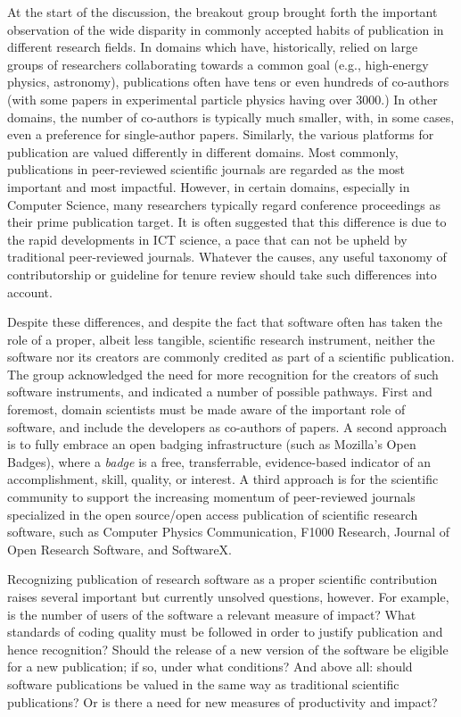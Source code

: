 \documentclass[11pt, oneside]{amsart}
\begin{document}
At the start of the discussion, the breakout group brought forth the
important observation of the wide disparity in commonly accepted habits of
publication in different research fields.
In domains which have, historically, relied on large groups of researchers
collaborating towards a common goal (e.g., high-energy physics,
astronomy), publications often have tens or even hundreds of co-authors (with
some papers in experimental particle physics having over 3000.)
In other domains, the number of co-authors is typically much smaller,
with, in some cases, even a preference for single-author papers.
Similarly, the various platforms for publication are valued differently in
different domains.
Most commonly, publications in peer-reviewed scientific journals are regarded
as the most important and most impactful.
However, in certain domains, especially in Computer Science, many researchers
typically regard conference proceedings as their prime publication target.
It is often suggested that this difference is due to the rapid developments
in ICT science, a pace that can not be upheld by traditional peer-reviewed
journals.
Whatever the causes, any useful taxonomy of contributorship or guideline for
tenure review should take such differences into account.

Despite these differences, and despite the fact that software often
has taken the role of a proper, albeit less tangible, scientific research
instrument, neither the software nor its creators are commonly credited as part
of a scientific publication.
The group acknowledged the need for more recognition for the creators of such
software instruments, and indicated a number of possible pathways.
First and foremost, domain scientists must be made aware of the important role
of software, and include the developers as co-authors of papers.
A second approach is to fully embrace an open badging infrastructure (such as
Mozilla's Open Badges), where a {\em badge\/} is a free, transferrable, 
evidence-based indicator of an accomplishment, skill, quality, or interest.
A third approach is for the scientific community to support the increasing
momentum of peer-reviewed journals specialized in the open source/open
access publication of scientific research software, such as Computer Physics
Communication, F1000 Research, Journal of Open Research Software, and SoftwareX.

Recognizing publication of research software as a proper scientific
contribution raises several important but currently unsolved questions,
however.
For example, is the number of users of the software a relevant measure of
impact?
What standards of coding quality must be followed in order to justify
publication and hence recognition?
Should the release of a new version of the software be eligible for a new
publication; if so, under what conditions?
And above all: should software publications be valued in the same way as
traditional scientific publications?
Or is there a need for new measures of productivity and impact?
\end{document}
